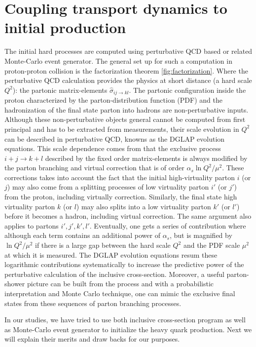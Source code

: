 \section{Coupling transport dynamics to initial production}
The initial hard processes are computed using perturbative QCD based or related Monte-Carlo event generator.
The general set up for such a computation in proton-proton collision is the factorization theorem \ref{fig:factorization}.
Where the perturbative QCD calculation provides the physics at short distance (a hard scale $Q^2$): the partonic matrix-elements $\hat{\sigma}_{ij\rightarrow kl}$.
The partonic configuration inside the proton characterized by the parton-distribution function (PDF) and the hadronization of the final state parton into hadrons are non-perturbative inputs.
Although these non-perturbative objects general cannot be computed from first principal and has to be extracted from measurements, their scale evolution in $Q^2$ can be described in perturbative QCD, knowns as the DGLAP evolution equations.
This scale dependence comes from that the exclusive process  $i+j \rightarrow k+l$ described by the fixed order matrix-elements is always modified by the parton branching and virtual correction that is of order $\alpha_s \ln Q^2/\mu^2$.
These corrections takes into account the fact that the initial high-virtuality parton $i$ (or $j$) may also come from a splitting processes of low virtuality parton $i'$ (or $j'$) from the proton, including virtually correction. 
Similarly, the final state high virtuality parton $k$ (or $l$) may also splits into a low virtuality parton $k'$ (or $l'$) before it becomes a hadron, including virtual correction.
The same argument also applies to partons $i', j', k', l'$. 
Eventually, one gets a series of contribution where although each term contains an additional power of $\alpha_s$, but is magnified by $\ln Q^2/\mu^2$ if there is a large gap between the hard scale $Q^2$ and the PDF scale $\mu^2$ at which it is measured.
The DGLAP evolution equations resum these logarithmic contributions systematically to increase the predictive power of the perturbative calculation of the inclusive cross-section.
Moreover, a useful parton-shower picture can be built from the process and with a probabilistic interpretation and Monte Carlo technique, one can mimic the exclusive final states from these sequences of parton branching processes.

In our studies, we have tried to use both inclusive cross-section program as well as Monte-Carlo event generator to initialize the heavy quark production.
Next we will explain their merits and draw backs for our purposes.

